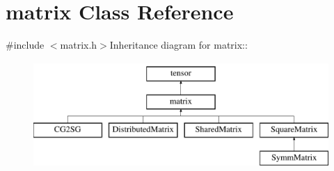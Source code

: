 \hypertarget{classJKBuilder_1_1matrix}{
\section{matrix Class Reference}
\label{classJKBuilder_1_1matrix}
}


{\ttfamily \#include $<$matrix.h$>$}Inheritance diagram for matrix::\begin{figure}[H]
\begin{center}
\leavevmode
\includegraphics[height=4cm]{classJKBuilder_1_1matrix}
\end{center}
\end{figure}
